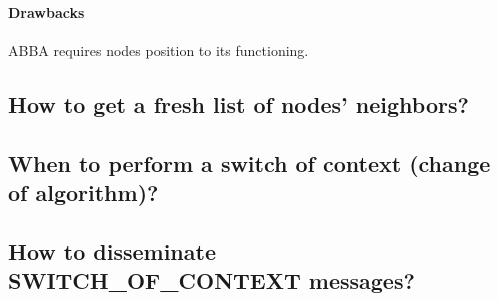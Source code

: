 \paragraph{Drawbacks} ABBA requires nodes position to its functioning. 

\subsection{How to get a fresh list of nodes' neighbors?}

\subsection{When to perform a switch of context (change of algorithm)?}
\subsection{How to disseminate SWITCH\_OF\_CONTEXT messages?}
